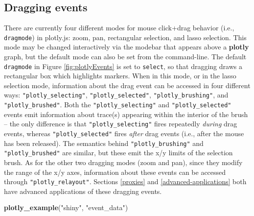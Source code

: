 \documentclass[
  12pt,
]{krantz}
\newenvironment{Shaded}{\begin{snugshade}}{\end{snugshade}}
\newcommand{\KeywordTok}[1]{\textcolor[rgb]{0.13,0.29,0.53}{\textbf{#1}}}
\newcommand{\NormalTok}[1]{#1}
\newcommand{\StringTok}[1]{\textcolor[rgb]{0.31,0.60,0.02}{#1}}
\begin{document}
\hypertarget{dragging-events}{%
\subsection{Dragging events}\label{dragging-events}}

There are currently four different modes for mouse click+drag behavior (i.e., \texttt{dragmode}) in plotly.js: zoom, pan, rectangular selection, and lasso selection. This mode may be changed interactively via the modebar that appears above a \textbf{plotly} graph, but the default mode can also be set from the command-line. The default \texttt{dragmode} in Figure \ref{fig:plotlyEvents} is set to \texttt{\textquotesingle{}select\textquotesingle{}}, so that dragging draws a rectangular box which highlights markers. When in this mode, or in the lasso selection mode, information about the drag event can be accessed in four different ways: \texttt{"plotly\_selecting"}, \texttt{"plotly\_selected"}, \texttt{"plotly\_brushing"}, and \texttt{"plotly\_brushed"}. Both the \texttt{"plotly\_selecting"} and \texttt{"plotly\_selected"} events emit information about trace(s) appearing within the interior of the brush -- the only difference is that \texttt{"plotly\_selecting"} fires repeatedly \emph{during} drag events, whereas \texttt{"plotly\_selected"} fires \emph{after} drag events (i.e., after the mouse has been released). The semantics behind \texttt{"plotly\_brushing"} and \texttt{"plotly\_brushed"} are similar, but these emit the x/y limits of the selection brush. As for the other two dragging modes (zoom and pan), since they modify the range of the x/y axes, information about these events can be accessed through \texttt{"plotly\_relayout"}. Sections \ref{proxies} and \ref{advanced-applications} both have advanced applications of these dragging events.

\begin{Shaded}
\begin{Highlighting}[]
\KeywordTok{plotly_example}\NormalTok{(}\StringTok{"shiny"}\NormalTok{, }\StringTok{"event_data"}\NormalTok{)}
\end{Highlighting}
\end{Shaded}
\end{document}
